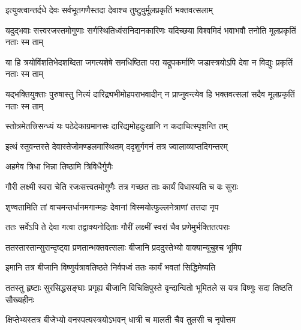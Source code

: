 \twolineshloka
{इत्युक्त्वान्तर्दधे देवः सर्वभूतगणैस्तदा}
{देवाश्च तुष्टुवुर्मूलप्रकृतिं भक्तवत्सलाम्} %


\fourlineindentedshloka
{यदुद्भवाः सत्त्वरजस्तमोगुणाः}
{सर्गस्थितिध्वंसनिदानकारिणः}
{यदिच्छया विश्वमिदं भवाभवौ}
{तनोति मूलप्रकृतिं नताः स्म ताम्} %

\twolineshloka
{या हि त्रयोविंशतिभेदशब्दिता जगत्यशेषे समधिष्ठिता परा}
{यद्रूपकर्माणि जडास्त्रयोऽपि देवा न विद्युः प्रकृतिं नताः स्म ताम्} %

\fourlineindentedshloka
{यद्भक्तियुक्ताः पुरुषास्तु नित्यं}
{दारिद्र्यभीमोहपराभवादीन्}
{न प्राप्नुवन्त्येव हि भक्तवत्सलां}
{सदैव मूलप्रकृतिं नताः स्म ताम्} %


\twolineshloka
{स्तोत्रमेतत्त्रिसन्ध्यं यः पठेदेकाग्रमानसः}
{दारिद्यमोहदुःखानि न कदाचित्स्पृशन्ति तम्} %

\twolineshloka
{इत्थं स्तुवन्तस्ते देवास्तेजोमण्डलमास्थितम्}
{ददृशुर्गगनं तत्र ज्वालाव्याप्तदिगन्तरम्} %




\onelineshloka
{अहमेव त्रिधा भिन्ना तिष्ठामि त्रिविधैर्गुणैः} %

\twolineshloka
{गौरी लक्ष्मी स्वरा चेति रजःसत्त्वतमोगुणैः}
{तत्र गच्छत ताः कार्यं विधास्यति च वः सुराः} %


\twolineshloka
{शृण्वतामिति तां वाचमन्तर्धानमगान्महः}
{देवानां विस्मयोत्फुल्लनेत्राणां तत्तदा नृप} %

\twolineshloka
{ततः सर्वेऽपि ते देवा गत्वा तद्वाक्यनोदिताः}
{गौरीं लक्ष्मीं स्वरां चैव प्रणेमुर्भक्तितत्पराः} %

\twolineshloka
{ततस्तास्तान्सुरान्दृष्ट्वा प्रणतान्भक्तवत्सलाः}
{बीजानि प्रददुस्तेभ्यो वाक्यान्यूचुश्च भूमिप} %


\twolineshloka
{इमानि तत्र बीजानि विष्णुर्यत्रावतिष्ठते}
{निर्वपध्वं ततः कार्यं भवतां सिद्धिमेष्यति} %

\fourlineindentedshloka
{ततस्तु हृष्टाः सुरसिद्धसङ्घाः}
{प्रगृह्य बीजानि विचिक्षिपुस्ते}
{वृन्दान्वितो भूमितले स यत्र}
{विष्णुः सदा तिष्ठति सौख्यहीनः} %





\twolineshloka
{क्षिप्तेभ्यस्तत्र बीजेभ्यो वनस्पत्यस्त्रयोऽभवन्}
{धात्री च मालती चैव तुलसी च नृपोत्तम} %

